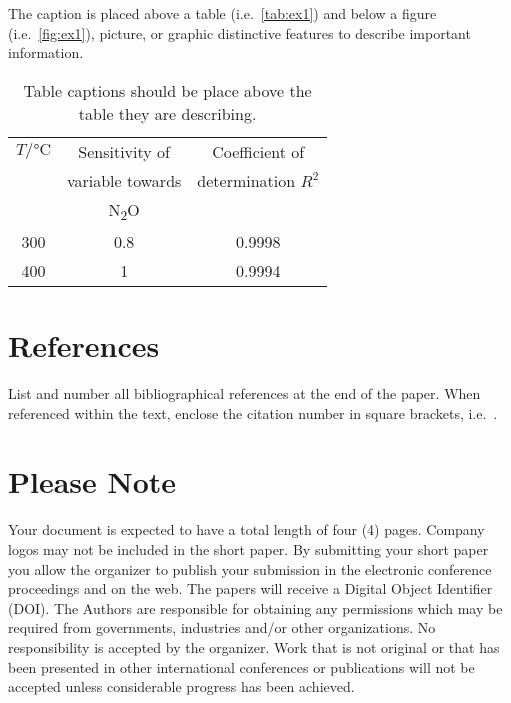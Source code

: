 \documentclass{ama}
\begin{document}
The caption is placed above a table (i.e.\ \autoref{tab:ex1}) and below a figure (i.e.\ \autoref{fig:ex1}), picture, or graphic distinctive features to describe important information.
%
\begin{table}[b]
    \caption{Table captions should be place above the table they are describing.}\label{tab:ex1}
    \centering
    \begin{tabular}{ccc}
        \toprule
        \(T / \si{\celsius}\) & Sensitivity of & Coefficient of \\
        & variable towards & determination \(R^2\)  \\
        & N\textsubscript{2}O & \\
        \midrule
        \num{300} & \num{0.8} & \num{0.9998} \\
        \midrule
        \num{400} & \num{1} & \num{0.9994} \\
        \bottomrule
    \end{tabular}
\end{table}

\section{References}
List and number all bibliographical references at the end of the paper.
When referenced within the text, enclose the citation number in square brackets, i.e.~\cite{mouse2011}.

\printbibliography{}

\section{Please Note}
Your document is expected to have a total length of four (4) pages.
Company logos may not be included in the short paper.
By submitting your short paper you allow the organizer to publish your submission in the electronic conference proceedings and on the web.
The papers will receive a Digital Object Identifier (DOI).
The Authors are responsible for obtaining any permissions which may be required from governments, industries and/or other organizations.
No responsibility is accepted by the organizer.
Work that is not original or that has been presented in other international conferences or publications will not be accepted unless considerable progress has been achieved.
\end{document}
